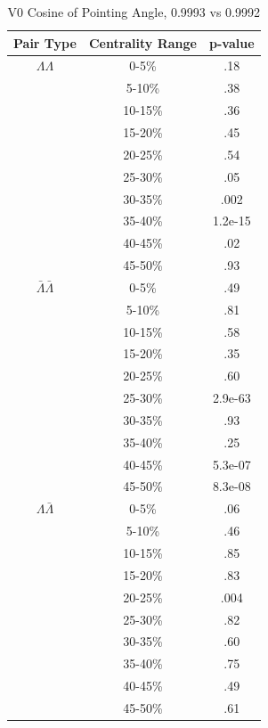 \begin{table}
\begin{minipage}{18pc}
\caption {V0 Cosine of Pointing Angle, 0.9993 vs 0.9992} \label{tab:V0CosPointingPvalueTests9993vs9992}
\begin{center}
\begin{tabular}{| c | c | c |}
  \hline                       
  Pair Type & Centrality Range & p-value \\
  \hline
  $\Lambda\Lambda$ & 0-5\% & .18 \\
   & 5-10\%  & .38 \\
   & 10-15\% & .36 \\
   & 15-20\% & .45 \\
   & 20-25\% & .54 \\
   & 25-30\% & .05 \\
   & 30-35\% & .002 \\
   & 35-40\% & 1.2e-15 \\
   & 40-45\% & .02 \\
   & 45-50\% & .93 \\
   \hline
  $\bar{\Lambda}\bar{\Lambda}$ &  0-5\% & .49 \\
   & 5-10\% & .81 \\
   & 10-15\% & .58 \\
   & 15-20\% & .35 \\
   & 20-25\% & .60 \\
   & 25-30\% & 2.9e-63 \\
   & 30-35\% & .93 \\
   & 35-40\% & .25 \\
   & 40-45\% & 5.3e-07 \\
   & 45-50\% & 8.3e-08 \\
   \hline
  $\Lambda\bar{\Lambda}$ &  0-5\% & .06 \\
   & 5-10\% & .46 \\
   & 10-15\% & .85 \\
   & 15-20\% & .83 \\
   & 20-25\% & .004 \\
   & 25-30\% & .82 \\
   & 30-35\% & .60 \\
   & 35-40\% & .75 \\
   & 40-45\% & .49 \\
   & 45-50\% & .61 \\
  \hline  
\end{tabular}
\end{center}
\end{minipage}

\end{table}
